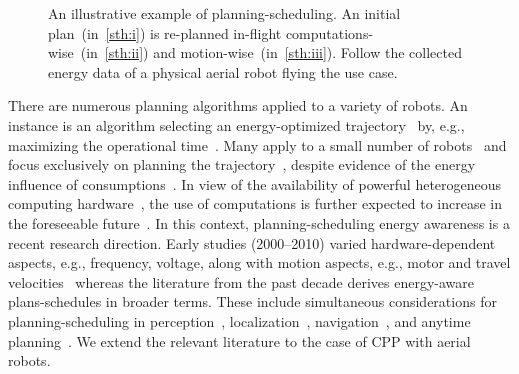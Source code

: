 \documentclass[letterpaper,10pt,journal,twoside]{IEEEtran}
\newcommand{\figpath}{./figures}
\theoremstyle{definition}
\begin{document}
\begin{figure}[t]
  \centering
  \vspace*{-6.5ex}
  \caption{An illustrative example of planning-scheduling. An initial plan~(in~\ref{sth:i}) is re-planned in-flight computations-wise~(in~\ref{sth:ii}) and motion-wise~(in~\ref{sth:iii}). Follow the collected energy data of a physical aerial robot flying the use case.}
  \label{fig:il-abs}
  \vspace*{-4.5ex}
\end{figure}

There are numerous planning algorithms applied to a variety of robots. An instance is an algorithm selecting an energy-optimized trajectory~\cite{mei2004energy} by, e.g., maximizing the operational time~\cite{wahab2015energy}. Many apply to a small number of robots~\cite{kim2005energy} and focus exclusively on planning the trajectory~\cite{kim2008minimum}, despite evidence of the energy influence of consumptions~\cite{mei2005case,ondruska2015scheduled,sudhakar2020balancing,brateman2006energy}. In view of the availability of powerful heterogeneous computing hardware~\cite{rizvi2017general}, the use of computations is further expected to increase in the foreseeable future~\cite{abramov2012real,satria2016real,jaramillo2019visual}. In this context, planning-scheduling energy awareness is a recent research direction. Early studies (2000--2010) varied hardware-dependent aspects, e.g., frequency, voltage, along with motion aspects, e.g., motor and travel velocities~\cite{mei2005case,brateman2006energy,zhang2007low,sadrpour2013mission} whereas the literature from the past decade derives energy-aware plans-schedules in broader terms. These include simultaneous considerations for planning-scheduling in perception~\cite{ondruska2015scheduled}, localization~\cite{lahijanian2018resource}, navigation~\cite{ho2019learning,ho2019qos,ho2018towards}, and anytime planning~\cite{sudhakar2020balancing}. We extend the relevant literature to the case of CPP with aerial robots. 
 
\end{document}
